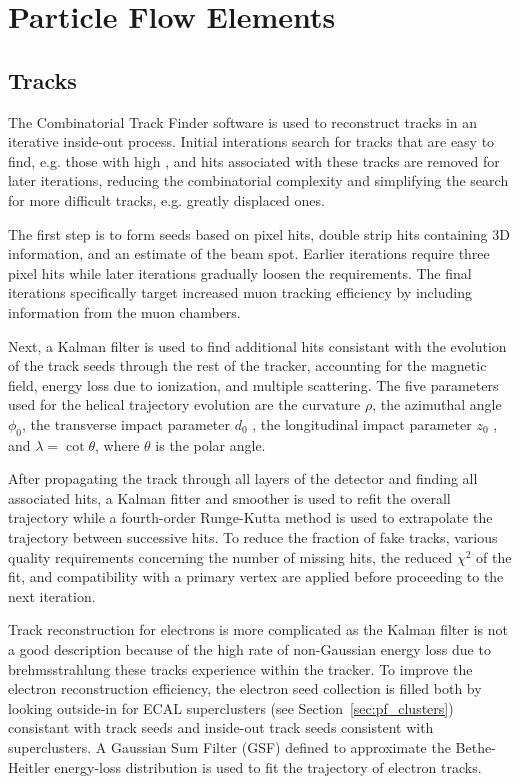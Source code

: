 \section{Particle Flow Elements}
\label{sec:pf_elements}

\subsection{Tracks}
\label{sec:pf_tracks}

The Combinatorial Track Finder software is used to reconstruct tracks in an iterative inside-out process.
Initial interations search for tracks that are easy to find, e.g. those with high \pt, and hits associated with these tracks are removed for later iterations, reducing the combinatorial complexity and simplifying the search for more difficult tracks, e.g. greatly displaced ones.

The first step is to form seeds based on pixel hits, double strip hits containing 3D information, and an estimate of the beam spot.
Earlier iterations require three pixel hits while later iterations gradually loosen the requirements. %
The final iterations specifically target increased muon tracking efficiency by including information from the muon chambers.

Next, a Kalman filter is used to find additional hits consistant with the evolution of the track seeds through the rest of the tracker, accounting for the magnetic field, energy loss due to ionization, and multiple scattering.
The five parameters used for the helical trajectory evolution are the curvature $\rho$, the azimuthal angle $\phi_0$, the transverse impact parameter $d_0$ , the longitudinal impact parameter $z_0$ , and $\lambda = \cot \theta$, where $\theta$ is the polar angle.

After propagating the track through all layers of the detector and finding all associated hits, a Kalman fitter and smoother is used to refit the overall trajectory while a fourth-order Runge-Kutta method is used to extrapolate the trajectory between successive hits.
To reduce the fraction of fake tracks, various quality requirements concerning the number of missing hits, the reduced $\chi^2$ of the fit, and compatibility with a primary vertex are applied before proceeding to the next iteration.

Track reconstruction for electrons is more complicated as the Kalman filter is not a good description because of the high rate of non-Gaussian energy loss due to brehmsstrahlung these tracks experience within the tracker.
To improve the electron reconstruction efficiency, the electron seed collection is filled both by looking outside-in for ECAL superclusters (see Section~\ref{sec:pf_clusters}) consistant with track seeds and inside-out track seeds consistent with superclusters.
A Gaussian Sum Filter (GSF) defined to approximate the Bethe-Heitler energy-loss distribution is used to fit the trajectory of electron tracks. 


